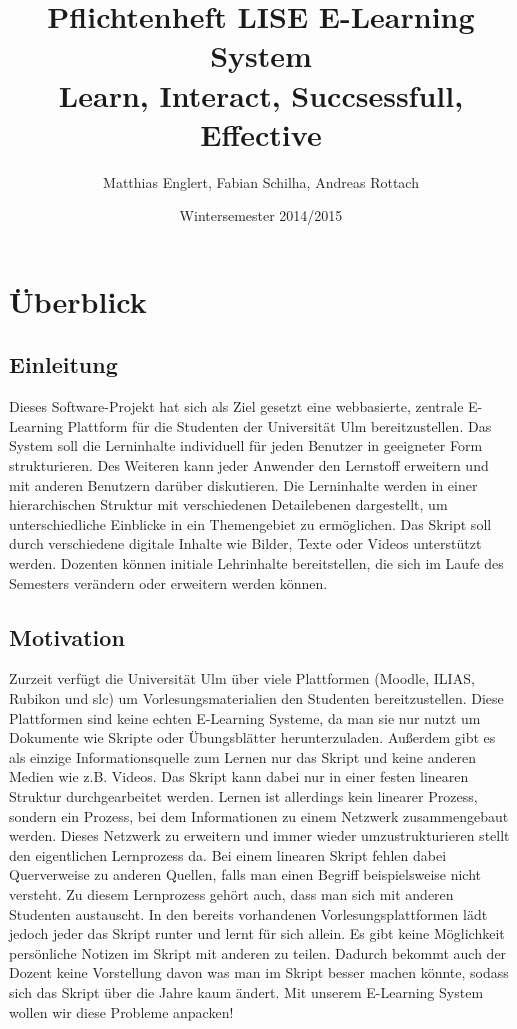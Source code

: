 \documentclass[12pt,a4paper]{article}
\title{Pflichtenheft LISE E-Learning System\\
		Learn, Interact, Succsessfull, Effective}
\author{Matthias Englert, Fabian Schilha, Andreas Rottach}
\date{Wintersemester 2014/2015}
\begin{document}
\maketitle
\newpage
\tableofcontents
\newpage

\section{Überblick}
\subsection{Einleitung}
Dieses Software-Projekt hat sich als Ziel gesetzt eine webbasierte, zentrale E-Learning Plattform für die Studenten der Universität Ulm bereitzustellen. Das System soll die Lerninhalte individuell für jeden Benutzer in geeigneter Form strukturieren. Des Weiteren kann jeder Anwender den Lernstoff erweitern und mit anderen Benutzern darüber diskutieren. Die Lerninhalte werden in einer hierarchischen Struktur mit verschiedenen Detailebenen dargestellt, um unterschiedliche Einblicke in ein Themengebiet zu ermöglichen. Das Skript soll durch verschiedene digitale Inhalte wie Bilder, Texte oder Videos unterstützt werden. Dozenten können initiale Lehrinhalte bereitstellen, die sich im Laufe des Semesters verändern oder erweitern werden können.

\subsection{Motivation}
Zurzeit verfügt die Universität Ulm über viele Plattformen (Moodle, ILIAS, Rubikon und slc) um Vorlesungsmaterialien den Studenten bereitzustellen. Diese Plattformen sind keine echten E-Learning Systeme, da man sie nur nutzt um Dokumente wie Skripte oder Übungsblätter herunterzuladen. Außerdem gibt es als einzige Informationsquelle zum Lernen nur das Skript und keine anderen Medien wie z.B. Videos. Das Skript kann dabei nur in einer festen linearen Struktur durchgearbeitet werden. Lernen ist allerdings kein linearer Prozess, sondern ein Prozess, bei dem Informationen zu einem Netzwerk zusammengebaut werden. Dieses Netzwerk zu erweitern und immer wieder umzustrukturieren stellt den eigentlichen Lernprozess da. Bei einem linearen Skript fehlen dabei Querverweise zu anderen Quellen, falls man einen Begriff beispielsweise nicht versteht. Zu diesem Lernprozess gehört auch, dass man sich mit anderen Studenten austauscht. In den bereits vorhandenen Vorlesungsplattformen lädt jedoch jeder das Skript runter und lernt für sich allein. Es gibt keine Möglichkeit persönliche Notizen im Skript mit anderen zu teilen. Dadurch bekommt auch der Dozent keine Vorstellung davon was man im Skript besser machen könnte, sodass sich das Skript über die Jahre kaum ändert.
Mit unserem E-Learning System wollen wir diese Probleme anpacken! 
\end{document}
